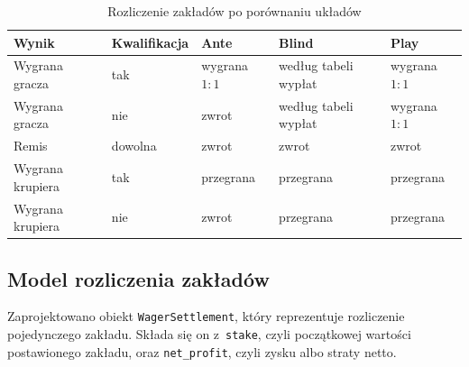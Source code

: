 \begin{table}[htbp]
    \centering
    \caption{Rozliczenie zakładów po porównaniu układów}
    \label{tab:rozliczenie-showdownu}
    {\setlength{\tabcolsep}{3pt}
    \begin{tabular}{
        |>{\centering\arraybackslash}m{}
        |>{\centering\arraybackslash}m{}
        |>{\centering\arraybackslash}m{}
        |>{\centering\arraybackslash}m{}
        |>{\centering\arraybackslash}m{}|
    }
        \hline
        \textbf{Wynik}
        &
        \textbf{Kwalifikacja}
        &
        \textbf{Ante}
        &
        \textbf{Blind}
        &
        \textbf{Play}
        \\
        \hline

        Wygrana gracza
        &
        tak
        &
        wygrana \(1{:}1\)
        &
        według tabeli wypłat
        &
        wygrana \(1{:}1\)
        \\
        \hline

        Wygrana gracza
        &
        nie
        &
        zwrot
        &
        według tabeli wypłat
        &
        wygrana \(1{:}1\)
        \\
        \hline

        Remis
        &
        dowolna
        &
        zwrot
        &
        zwrot
        &
        zwrot
        \\
        \hline

        Wygrana krupiera
        &
        tak
        &
        przegrana
        &
        przegrana
        &
        przegrana
        \\
        \hline

        Wygrana krupiera
        &
        nie
        &
        zwrot
        &
        przegrana
        &
        przegrana
        \\
        \hline
    \end{tabular}}
\end{table}

\subsection{Model rozliczenia zakładów}
\label{subsec:model-rozliczenia}

Zaprojektowano obiekt \texttt{WagerSettlement}, który reprezentuje rozliczenie pojedynczego zakładu.
Składa się on z~\texttt{stake}, czyli początkowej wartości postawionego zakładu, oraz \texttt{net\_profit}, czyli zysku albo straty netto.

